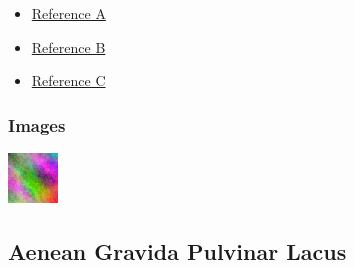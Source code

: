 \documentclass[a4paper]{article}
\def\tightlist{}
\begin{document}
      \begin{itemize}
\tightlist
\item
  \href{https://example.com/}{Reference A}
\item
  \href{https://example.com/}{Reference B}
\item
  \href{https://example.com/}{Reference C}
\end{itemize}

    
          \subsubsection{Images}
      
              \begin{minipage}[c]{\textwidth}
          \centering
          \includegraphics[width=\textwidth]{src/issues/issue.png}
          \label{issue.md:issue.png}
          \vspace{4ex}
        \end{minipage}
          
    \clearpage

      \newpage
    
    \subsection{Aenean Gravida Pulvinar Lacus}
    \label{issue2.md}
\end{document}
